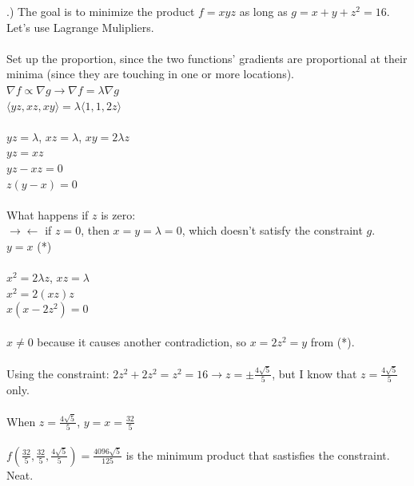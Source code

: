 \documentclass[12pt]{article}
\begin{document}
.) The goal is to minimize the product $f = xyz$ as long as $g = x + y + z^{2} = 16$. Let's use Lagrange Mulipliers.\\\\
\noindent Set up the proportion, since the two functions' gradients are proportional at their minima (since they are touching in one or more locations).
\noindent $\nabla f \propto \nabla g \rightarrow \nabla f = \lambda \nabla g$\\
\noindent $ \langle yz, xz, xy\rangle = \lambda \langle 1, 1, 2z\rangle$\\\\
\noindent $yz = \lambda$, \hspace{10pt} $xz = \lambda$, \hspace{10pt} $xy = 2\lambda z$\\
\noindent $yz = xz$\\
\noindent $yz - xz = 0$\\
\noindent $z(y -x) = 0$\\\\
\noindent What happens if $z$ is zero: \\
\noindent $\rightarrow \leftarrow$ if $z = 0$, then $x = y = \lambda = 0$, which doesn't satisfy the constraint $g$.\\
\noindent $y = x$ (*)\\\\
\noindent $x^{2} = 2\lambda z$, \hspace{10pt} $xz = \lambda$\\
\noindent $x^{2} = 2(xz)z$\\
\noindent $x(x - 2z^{2}) = 0$\\\\
\noindent $x \neq 0$ because it causes another contradiction, so $x = 2z^{2} = y$ from (*).\\\\
\noindent Using the constraint: $2z^{2} + 2z^{2} = z^{2} = 16 \rightarrow z = \pm \frac{4\sqrt{5}}{5}$, but I know that $z = \frac{4\sqrt{5}}{5}$ only. \\\\
\noindent When $z = \frac{4\sqrt{5}}{5}$, $y = x = \frac{32}{5}$\\\\
\noindent $f(\frac{32}{5}, \frac{32}{5}, \frac{4\sqrt{5}}{5}) = \frac{4096\sqrt{5}}{125}$ is the minimum product that sastisfies the constraint. Neat. \bcsmbh
\end{document}
